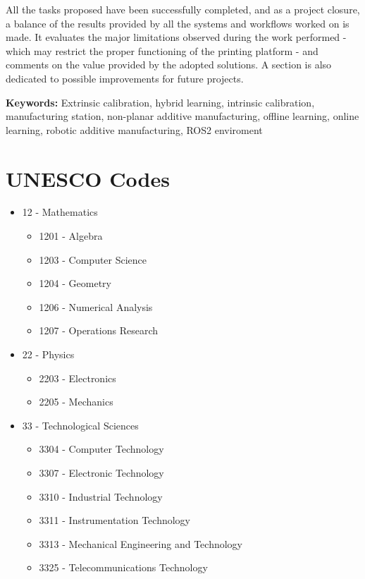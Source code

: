 All the tasks proposed have been successfully completed, and as a project closure, a balance of the results provided by all the systems and workflows worked on is made. It evaluates the major limitations observed during the work performed - which may restrict the proper functioning of the printing platform - and comments on the value provided by the adopted solutions. A section is also dedicated to possible improvements for future projects.

\textbf{Keywords:} Extrinsic calibration, hybrid learning, intrinsic calibration, manufacturing station, non-planar additive manufacturing, offline learning, online learning, robotic additive manufacturing, ROS2 enviroment


\section*{UNESCO Codes} 
\begin{itemize}
    \item[] 12 - Mathematics
        \begin{itemize}
            \item[] 1201 - Algebra
            \item[] 1203 - Computer Science
            \item[] 1204 - Geometry
            \item[] 1206 - Numerical Analysis
            \item[] 1207 - Operations Research
        \end{itemize}
        
    \item[] 22 - Physics
        \begin{itemize}
            \item[] 2203 - Electronics
            \item[] 2205 - Mechanics
        \end{itemize}
        
    \item[] 33 - Technological Sciences
        \begin{itemize}
            \item[] 3304 - Computer Technology
            \item[] 3307 - Electronic Technology
            \item[] 3310 - Industrial Technology
            \item[] 3311 - Instrumentation Technology
            \item[] 3313 - Mechanical Engineering and Technology
            \item[] 3325 - Telecommunications Technology
        \end{itemize}
\end{itemize}



